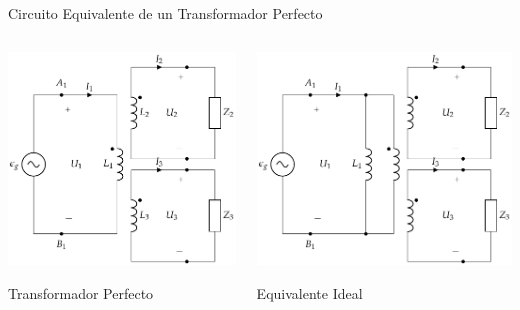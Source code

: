 \documentclass[aspectratio=169, usenames,svgnames,dvipsnames]{beamer}
\begin{document}
\begin{frame}[label={sec:orgabcf7d0}]{Circuito Equivalente de un Transformador Perfecto}
\begin{columns}
\begin{column}{0.5\columnwidth}
\begin{center}
\includegraphics[width=\textwidth]{../figs/TrafoPerfectoVariosDevanados_Impedancia.pdf}
\end{center}
Transformador Perfecto
\end{column}
\begin{column}{0.5\columnwidth}
\begin{center}
\includegraphics[width=\textwidth]{../figs/TrafoPerfectoIdealVariosDevanados_Impedancia.pdf}
\end{center}
Equivalente Ideal
\end{column}
\end{columns}
\end{frame}
\end{document}
